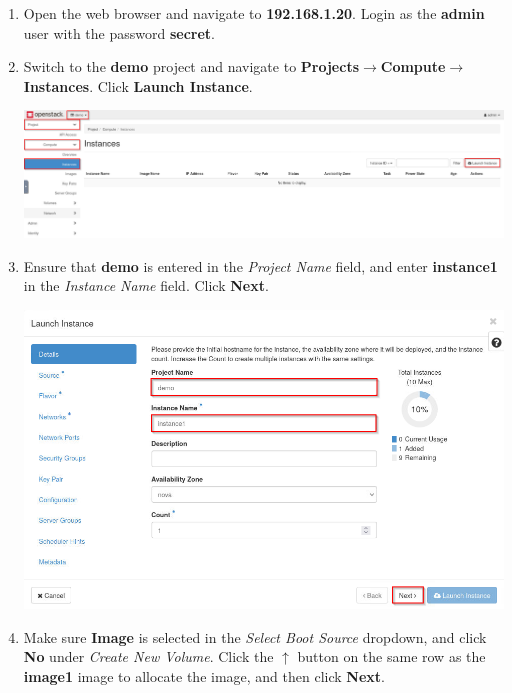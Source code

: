 \documentclass[letterpaper, 12pt]{article}
\begin{document}
\begin{enumerate}
    \item Open the web browser and navigate to \textbf{192.168.1.20}. Login as the \textbf{admin} user with the password
    \textbf{secret}.

    \item Switch to the \textbf{demo} project and navigate to
    \textbf{Projects$\rightarrow$Compute$\rightarrow$Instances}. Click \textbf{Launch Instance}.

    \begin{center}
        \includegraphics[width=\linewidth]{images/part4/step2.png}
    \end{center}

    \item Ensure that \textbf{demo} is entered in the \textit{Project Name} field, and enter \textbf{instance1} in the
    \textit{Instance Name} field. Click \textbf{Next}.
    
    \begin{center}
        \includegraphics[width=\linewidth]{images/part4/step3.png}
    \end{center}

    \item Make sure \textbf{Image} is selected in the \textit{Select Boot Source} dropdown, and click \textbf{No} under
    \textit{Create New Volume}. Click the $\uparrow$ button on the same row as the \textbf{image1} image to allocate the
    image, and then click \textbf{Next}.


\end{enumerate}
\end{document}
